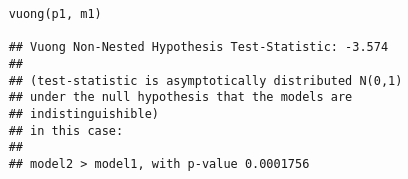 \documentclass[MASTER.tex]{subfiles}
\begin{document}
\begin{frame}[fragile]

	\begin{verbatim}
	vuong(p1, m1)
	
	## Vuong Non-Nested Hypothesis Test-Statistic: -3.574 
	##
	## (test-statistic is asymptotically distributed N(0,1) 
	## under the null hypothesis that the models are 
	## indistinguishible)
	## in this case:
	##
	## model2 > model1, with p-value 0.0001756
	\end{verbatim}
\end{frame}
\end{document}
